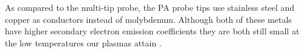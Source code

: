 As compared to the multi-tip probe, the PA probe tips use stainless steel and copper as conductors instead of molybdenum. Although both of these metals have higher secondary electron emission coefficients they are both still small at the low temperatures our plasmas attain \cite{Dekker_1958}.












